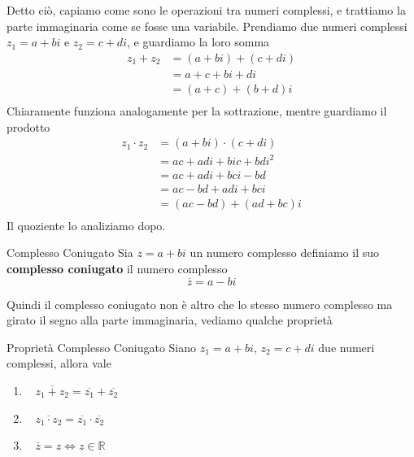 \documentclass{rapport}
\begin{document}
 Detto ciò, capiamo come sono le operazioni tra numeri complessi, e trattiamo la parte immaginaria come se fosse una variabile.  Prendiamo due numeri complessi $z_1 = a + bi$ e $z_2 = c + di$, e guardiamo la loro somma
\begin{align*}
   z_1 + z_2 &= (a+bi) + (c+di) \\
   &= a+c + bi + di\\
   &= (a+c) + (b+d)i \\
 \end{align*}
 Chiaramente funziona analogamente per la sottrazione, mentre guardiamo il prodotto
\begin{align*}
   z_1 \cdot z_2 &= (a+bi) \cdot (c+di) \\
   &= ac + adi + bic + bdi^2\\
   &= ac + adi + bci - bd\\
   &= ac  - bd+ adi + bci \\
   &= (ac  - bd)+ (ad + bc)i \\
 \end{align*}
 Il quoziente lo analiziamo dopo. 

\begin{definizione}{Complesso Coniugato}{}
  Sia $z = a+bi$ un numero complesso definiamo il suo \textbf{complesso coniugato} il numero complesso 
  \[
  \overline{z} = a-bi
  \]
\end{definizione}
Quindi il complesso coniugato non è altro che lo stesso numero complesso ma girato il segno alla parte immaginaria, vediamo qualche proprietà
\begin{teorema}{Proprietà Complesso Coniugato}{}
  Siano $z_1 = a+bi$, $z_2 = c+di$ due numeri complessi, allora vale 
  \begin{enumerate}[label=(\roman*)]
    \centering
    \item  $\;\;\;\overline{z_1 + z_2} = \overline{z_1}  + \overline{z_2}$
    \item  $\;\;\;\overline{z_1 \cdot z_2} = \overline{z_1}  \cdot \overline{z_2}$
    \item   $\;\;\;\overline{z} = z \iff z \in \mathbb{R}$
  \end{enumerate}
\end{teorema}
\end{document}
